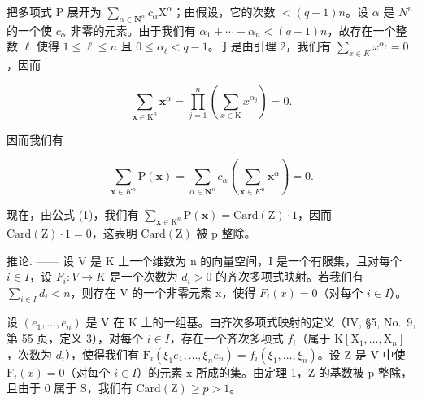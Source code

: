 把多项式 P 展开为 \(\sum_{\alpha\in\mathbf{N}^{n}}c_{\alpha}\mathrm{X}^{\alpha}\)；由假设，它的次数 \(< (q-1)n\)。设 \(\alpha\) 是 \(N^{n}\) 的一个使 \(c_{\alpha}\) 非零的元素。由于我们有 \(\alpha_{1}+\cdots+\alpha_{n}<(q-1)n\)，故存在一个整数 \(\ell\) 使得 \(1\leqslant\ell\leqslant n\) 且 \(0\leqslant\alpha_{\ell}<q-1\)。于是由引理 2，我们有 \(\sum_{x\in K}x^{\alpha_{\ell}}=0\)，因而

\[
\sum_ {\mathbf {x} \in \mathrm{K} ^ {n}} \mathbf {x} ^ {\alpha} = \prod_ {j = 1} ^ {n} \left(\sum_ {x \in \mathrm{K}} x ^ {\alpha_ {j}}\right) = 0.
\]

因而我们有

\[
\sum_ {\mathbf {x} \in K ^ {n}} \mathrm{P} (\mathbf {x}) = \sum_ {\alpha \in \mathbf {N} ^ {n}} c _ {\alpha} \left(\sum_ {\mathbf {x} \in K ^ {n}} \mathbf {x} ^ {\alpha}\right) = 0.
\]

现在，由公式 (1)，我们有 \(\sum_{\mathbf{x}\in\mathrm{K}^{n}}\mathrm{P}(\mathbf{x})=\mathrm{Card}(\mathrm{Z})\cdot1\)，因而 \(\mathrm{Card}(\mathrm{Z})\cdot1=0\)，这表明 \(\mathrm{Card}(\mathrm{Z})\) 被 p 整除。

推论. —— 设 V 是 K 上一个维数为 n 的向量空间，I 是一个有限集，且对每个 \(i \in I\)，设 \(F_{i}: V \to K\) 是一个次数为 \(d_{i} > 0\) 的齐次多项式映射。若我们有 \(\sum_{i \in I} d_{i} < n\)，则存在 V 的一个非零元素 x，使得 \(F_{i}(x) = 0\)（对每个 \(i \in I\)）。

设 \((e_{1},\ldots,e_{n})\) 是 V 在 K 上的一组基。由齐次多项式映射的定义（IV, §5, No.~9, 第 55 页，定义 3），对每个 \(i\in I\)，存在一个齐次多项式 \(f_{i}\)（属于 \(\mathrm{K}[\mathrm{X}_{1},\ldots,\mathrm{X}_{n}]\)，次数为 \(d_{i}\)），使得我们有 \(\mathrm{F}_{i}(\xi_{1}e_{1},\ldots,\xi_{n}e_{n})=f_{i}(\xi_{1},\ldots,\xi_{n})\)。设 Z 是 V 中使 \(\mathrm{F}_{i}(x)=0\)（对每个 \(i\in I\)）的元素 x 所成的集。由定理 1，Z 的基数被 p 整除，且由于 0 属于 S，我们有 \(\mathrm{Card}(\mathrm{Z})\geqslant p>1\)。

